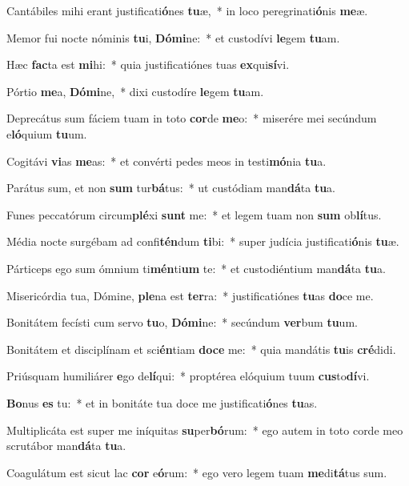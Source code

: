 \item Cantábiles mihi erant justificati\textbf{ó}nes \textbf{tu}æ,~* in loco peregrinati\textbf{ó}nis \textbf{me}æ.
\item Memor fui nocte nóminis \textbf{tu}i, \textbf{Dó}\textbf{mi}ne:~* et custodívi \textbf{le}gem \textbf{tu}am.
\item Hæc \textbf{fac}ta est \textbf{mi}hi:~* quia justificatiónes tuas \textbf{ex}qui\textbf{sí}vi.
\item Pórtio \textbf{me}a, \textbf{Dó}\textbf{mi}ne,~* dixi custodíre \textbf{le}gem \textbf{tu}am.
\item Deprecátus sum fáciem tuam in toto \textbf{cor}de \textbf{me}o:~* miserére mei secúndum e\textbf{ló}quium \textbf{tu}um.
\item Cogitávi \textbf{vi}as \textbf{me}as:~* et convérti pedes meos in testi\textbf{mó}nia \textbf{tu}a.
\item Parátus sum, et non \textbf{sum} tur\textbf{bá}tus:~* ut custódiam man\textbf{dá}ta \textbf{tu}a.
\item Funes peccatórum circum\textbf{plé}xi \textbf{sunt} me:~* et legem tuam non \textbf{sum} ob\textbf{lí}tus.
\item Média nocte surgébam ad confi\textbf{tén}dum \textbf{ti}bi:~* super judícia justificati\textbf{ó}nis \textbf{tu}æ.
\item Párticeps ego sum ómnium ti\textbf{mén}ti\textbf{um} te:~* et custodiéntium man\textbf{dá}ta \textbf{tu}a.
\item Misericórdia tua, Dómine, \textbf{ple}na est \textbf{ter}ra:~* justificatiónes \textbf{tu}as \textbf{do}ce me.
\item Bonitátem fecísti cum servo \textbf{tu}o, \textbf{Dó}\textbf{mi}ne:~* secúndum \textbf{ver}bum \textbf{tu}um.
\item Bonitátem et disciplínam et sci\textbf{én}tiam \textbf{do}\textbf{ce} me:~* quia mandátis \textbf{tu}is \textbf{cré}didi.
\item Priúsquam humiliárer \textbf{e}go de\textbf{lí}qui:~* proptérea elóquium tuum \textbf{cus}to\textbf{dí}vi.
\item \textbf{Bo}nus \textbf{es} tu:~* et in bonitáte tua doce me justificati\textbf{ó}nes \textbf{tu}as.
\item Multiplicáta est super me iníquitas \textbf{su}per\textbf{bó}rum:~* ego autem in toto corde meo scrutábor man\textbf{dá}ta \textbf{tu}a.
\item Coagulátum est sicut lac \textbf{cor} e\textbf{ó}rum:~* ego vero legem tuam \textbf{me}di\textbf{tá}tus sum.
